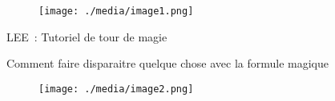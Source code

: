 \documentclass[12pt]{article}
\begin{document}

\begin{figure}[H]
	\begin{Center}
		\texttt{[image: ./media/image1.png]}
	\end{Center}
\end{figure}



\setlength{\parskip}{0.0pt}
\par


\vspace{\baselineskip}

\vspace{\baselineskip}

\vspace{\baselineskip}
\begin{Center}
{\fontsize{28pt}{33.6pt}\selectfont LEE : Tutoriel de tour de magie\par}
\end{Center}\par


\vspace{\baselineskip}
\begin{Center}
{\fontsize{20pt}{24.0pt}\selectfont Comment faire disparaitre quelque chose avec la formule magique\par}
\end{Center}\par




\begin{figure}[H]
	\begin{Center}
		\texttt{[image: ./media/image2.png]}
	\end{Center}
\end{figure}



\begin{Center}

\end{Center}\par



\end{document}
